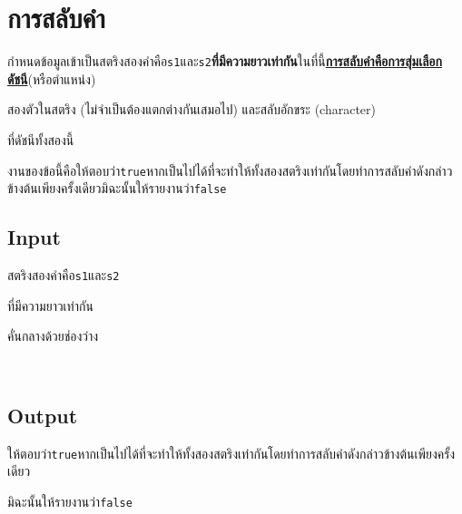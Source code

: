 \documentclass{article}
\begin{document}
\section*{การสลับคำ}

กำหนดข้อมูลเข้าเป็นสตริงสองคำคือ\texttt{s1}และ\texttt{s2}\textbf{ที่มีความยาวเท่ากัน}ในที่นี้\ul{\textbf{การสลับคำคือการสุ่มเลือกดัชนี}}(หรือตำแหน่ง)

สองตัวในสตริง (ไม่จำเป็นต้องแตกต่างกันเสมอไป) และสลับอักขระ (character)

ที่ดัชนีทั้งสองนี้

งานของข้อนี้คือให้ตอบว่า\texttt{true}หากเป็นไปได้ที่จะทำให้ทั้งสองสตริงเท่ากันโดยทำการสลับคำดังกล่าวข้างต้นเพียงครั้งเดียวมิฉะนั้นให้รายงานว่า\texttt{false}\\



\subsection*{Input}
{สตริงสองคำคือ}{\texttt{s1}}{และ}{\texttt{s2}}{ที่มีความยาวเท่ากัน

คั่นกลางด้วยช่องว่าง}\\



\subsection*{Output}
ให้ตอบว่า\texttt{true}หากเป็นไปได้ที่จะทำให้ทั้งสองสตริงเท่ากันโดยทำการสลับคำดังกล่าวข้างต้นเพียงครั้งเดียว



มิฉะนั้นให้รายงานว่า\texttt{false}\\
\end{document}
